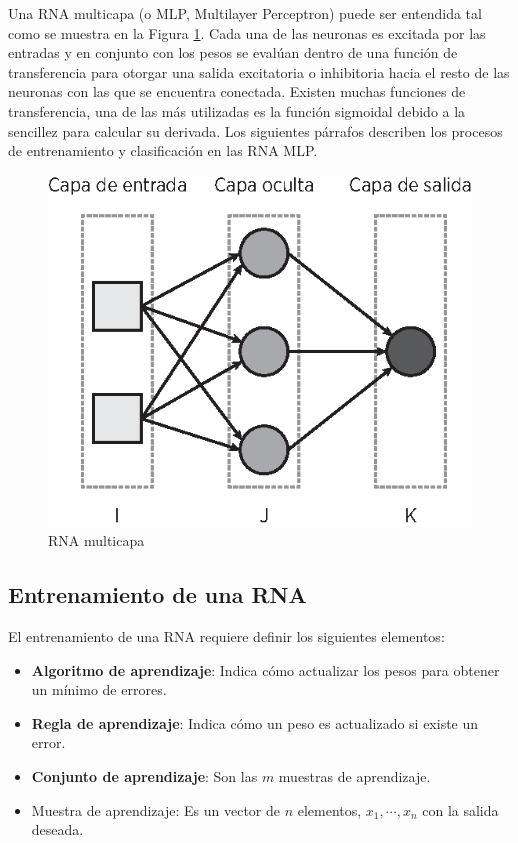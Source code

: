 \documentclass[journal]{IEEEtran}
\begin{document}
Una RNA multicapa (o MLP, Multilayer Perceptron) puede ser entendida tal como se muestra en la Figura \ref{fig:rna-mlp}.
Cada una de las neuronas es excitada por las entradas y en conjunto con los pesos se evalúan dentro de una función de transferencia para otorgar una salida excitatoria o inhibitoria hacia el resto de las neuronas con las que se encuentra conectada.
Existen muchas funciones de transferencia, una de las más utilizadas es la función sigmoidal debido a la sencillez para calcular su derivada.
Los siguientes párrafos describen los procesos de entrenamiento y clasificación en las RNA MLP.
\begin{figure}[tb]
	\centering
	\includegraphics[]{imagenes/mlp}
	\caption{RNA multicapa}
	\label{fig:rna-mlp}
\end{figure}

\subsection{Entrenamiento de una RNA} %
\label{sub:entrenamiento_de_una_RNA}
El entrenamiento de una RNA requiere definir los siguientes elementos:
\begin{itemize}
	\item \textbf{Algoritmo de aprendizaje}: Indica cómo actualizar los pesos para obtener un mínimo de errores.
	\item \textbf{Regla de aprendizaje}: Indica cómo un peso es actualizado si existe un error.
	\item \textbf{Conjunto de aprendizaje}: Son las $m$ muestras de aprendizaje.
	\item Muestra de aprendizaje: Es un vector de $n$ elementos, $x_1, \cdots, x_n$ con la salida deseada. 
\end{itemize}
\end{document}
